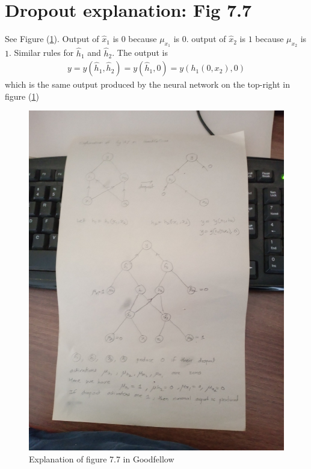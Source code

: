 \documentclass{article}
\newcommand{\ber}{\begin{eqnarray}}
\newcommand{\eer}{\end{eqnarray}}
\begin{document}
\section{Dropout explanation: Fig 7.7}
See Figure (\ref{fig:goodfellow77}). Output of $\hat{x}_1$ is $0$ because $\mu_{x_1}$ is $0$. output of $\hat{x}_2$ is $1$ because $\mu_{x_2}$ is $1$. Similar rules for $\hat{h}_1$ and $\hat{h}_2$. The output is
\ber
y = y(\hat{h}_1,\hat{h}_2) = y(\hat{h}_1,0) = y(h_1(0,x_2),0)
\eer
which is the same output produced by the neural network on the top-right in figure (\ref{fig:goodfellow77})
\begin{figure}[h]
\centering  
\includegraphics[width=14cm]{goodfellow_fig/dropout_fig_77.jpg}
\caption{\label{fig:goodfellow77} Explanation of figure 7.7 in Goodfellow}
\end{figure}  
%
%
%
\end{document}
